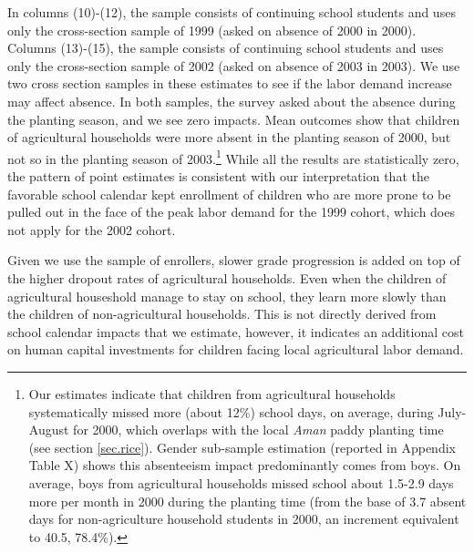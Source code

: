 \documentclass[12pt,letterpaper]{article}\usepackage[margin=1in]{geometry}
\newcommand{\0}{\ensuremath{\mbox{\boldmath $0$}}}
\begin{document}
In columns (10)-(12), the sample consists of continuing school students and uses only the cross-section sample of 1999 (asked on absence of 2000 in 2000). Columns (13)-(15), the sample consists of continuing school students and uses only the cross-section sample of 2002 (asked on absence of 2003 in 2003). We use two cross section samples in these estimates to see if the labor demand increase may affect absence. In both samples, the survey asked about the absence during the planting season, and we see zero impacts. Mean outcomes show that children of agricultural households were more absent in the planting season of 2000, but not so in the planting season of 2003.\footnote{Our estimates indicate that children from agricultural households systematically missed more (about 12\%) school days, on average, during July-August for 2000, which overlaps with the local \textit{Aman} paddy planting time (see section \ref{sec.rice}). Gender sub-sample estimation (reported in Appendix Table X) shows this absenteeism impact predominantly comes from boys. On average, boys from agricultural households missed school about 1.5-2.9 days more per month in 2000 during the planting time (from the base of 3.7 absent days for non-agriculture household students in 2000, an increment equivalent to 40.5, 78.4\%). } While all the results are statistically zero, the pattern of point estimates is consistent with our interpretation that the favorable school calendar kept enrollment of children who are more prone to be pulled out in the face of the peak labor demand for the 1999 cohort, which does not apply for the 2002 cohort. 

Given we use the sample of enrollers, slower grade progression is added on top of the higher dropout rates of agricultural households. Even when the children of agricultural houseshold manage to stay on school, they learn more slowly than the children of non-agricultural households. This is not directly derived from school calendar impacts that we estimate, however, it indicates an additional cost on human capital investments for children facing local agricultural labor demand.
\end{document}
